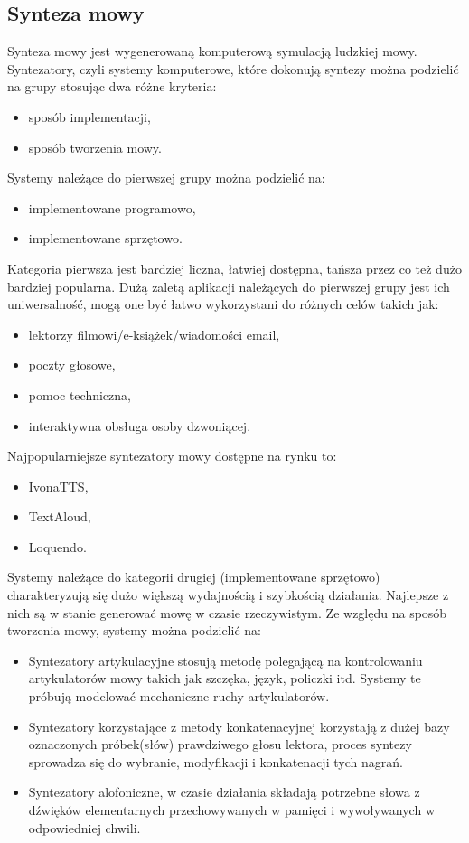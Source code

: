 \subsection{Synteza mowy}   
Synteza mowy jest wygenerowaną komputerową symulacją ludzkiej mowy. Syntezatory, czyli systemy komputerowe, które dokonują syntezy można podzielić na grupy stosując dwa różne kryteria:
\begin{itemize}
	\item sposób implementacji,
	\item sposób tworzenia mowy.
\end{itemize}
Systemy należące do pierwszej grupy można podzielić na:
\begin{itemize}
	\item implementowane programowo,
	\item implementowane sprzętowo.
\end{itemize}
Kategoria pierwsza jest bardziej liczna, łatwiej dostępna, tańsza przez co też dużo bardziej popularna. Dużą zaletą aplikacji należących do pierwszej grupy jest ich uniwersalność,  mogą one być łatwo wykorzystani do różnych celów takich jak:
\begin{itemize}
	\item lektorzy filmowi/e-książek/wiadomości email,
	\item poczty głosowe,
	\item pomoc techniczna,
	\item interaktywna obsługa osoby  dzwoniącej.
\end{itemize}
Najpopularniejsze syntezatory mowy dostępne na rynku to:
\begin{itemize}
	\item IvonaTTS,
	\item TextAloud,
	\item Loquendo.
\end{itemize}
Systemy należące do kategorii drugiej (implementowane sprzętowo) charakteryzują się dużo większą wydajnością i szybkością działania. Najlepsze z nich są w stanie generować mowę w czasie rzeczywistym. 
Ze względu na sposób tworzenia mowy, systemy można podzielić na:
\begin{itemize}
	\item Syntezatory artykulacyjne stosują metodę polegającą na kontrolowaniu artykulatorów mowy takich jak szczęka, język, policzki itd. Systemy te próbują modelować mechaniczne ruchy artykulatorów.
	\item Syntezatory korzystające z metody konkatenacyjnej korzystają z dużej bazy oznaczonych próbek(słów) prawdziwego głosu lektora, proces syntezy sprowadza się do wybranie, modyfikacji i konkatenacji tych nagrań. 
	\item Syntezatory alofoniczne, w czasie działania składają potrzebne słowa z dźwięków elementarnych przechowywanych w pamięci i wywoływanych w odpowiedniej chwili. 
\end{itemize}

